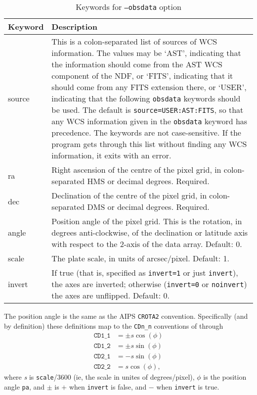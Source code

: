 \documentclass[twoside,11pt]{article}
\begin{document}
\begin{table}
\begin{center}
\begin{tabular}{l|p{10cm}}
Keyword & Description \\ \hline
source & This is a colon-separated list of sources of WCS information. The
values may be `AST', indicating that the information should come from the AST
WCS component of the NDF, or `FITS', indicating that it should come from any
FITS extension there, or `USER', indicating that the following
\texttt{obsdata} keywords should be used. The default is
\texttt{source=USER:AST:FITS}, so that any WCS information given in the
\texttt{obsdata} keyword has precedence. The keywords are not
case-sensitive. If the program gets through this list without finding any WCS
information, it exits with an error.\\
ra & Right ascension of the centre of the pixel grid, in colon-separated HMS
or decimal degrees. Required.\\
dec & Declination of the centre of the pixel grid, in colon-separated DMS or
decimal degrees. Required.\\
angle & Position angle of the pixel grid. This is the rotation, in degrees
anti-clockwise, of the declination or latitude axis with respect to the 2-axis
of the data array. Default: 0.\\
scale & The plate scale, in units of arcsec/pixel. Default: 1.\\
invert & If true (that is, specified as \texttt{invert=1} or just
\texttt{invert}), the axes are inverted; otherwise (\texttt{invert=0} or
\texttt{noinvert}) the axes are unflipped. Default: 0.
\end{tabular}
\end{center}
\caption{\label{tab:obsdata}Keywords for \texttt{--obsdata} option}
\end{table}

The position angle is the same as the AIPS \texttt{CROTA2}
convention. Specifically (and by definition) these definitions map to the
\texttt{CDn\_n} conventions of \cite{fitswcs2} through
\begin{align*}
\texttt{CD1\_1} & = \pm s \cos( \phi ) \\
\texttt{CD1\_2} & = \pm s \sin( \phi ) \\
\texttt{CD2\_1} & = - s \sin( \phi ) \\
\texttt{CD2\_2} & = s \cos( \phi ),
\end{align*}
where \textit{s} is \texttt{scale}/3600 (ie, the scale in unites of
degrees/pixel), $\phi$ is the position angle \texttt{pa}, and $\pm$ is $+$
when \texttt{invert} is false, and $-$ when \texttt{invert} is true.
\end{document}
